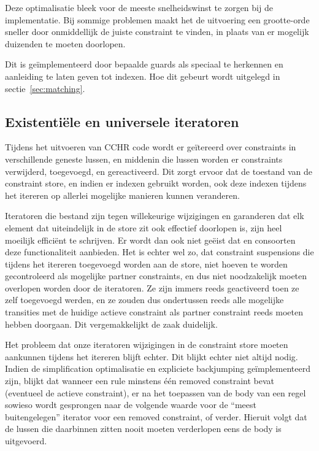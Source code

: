 Deze optimalisatie bleek voor de meeste snelheidswinst te zorgen bij de implementatie. Bij sommige problemen maakt het de uitvoering een grootte-orde sneller door onmiddellijk de juiste constraint te vinden, in plaats van er mogelijk duizenden te moeten doorlopen.

Dit is ge\"implementeerd door bepaalde guards als speciaal te herkennen en aanleiding te laten geven tot indexen. Hoe dit gebeurt wordt uitgelegd in sectie~\ref{sec:matching}.
 
\subsection{Existenti\"ele en universele iteratoren} \label{sec:gencode-iter}

Tijdens het uitvoeren van CCHR code wordt er ge\"itereerd over constraints in verschillende geneste lussen, en middenin die lussen worden er constraints verwijderd, toegevoegd, en gereactiveerd. Dit zorgt ervoor dat de toestand van de constraint store, en indien er indexen gebruikt worden, ook deze indexen tijdens het itereren op allerlei mogelijke manieren kunnen veranderen.

Iteratoren die bestand zijn tegen willekeurige wijzigingen en garanderen dat elk element dat uiteindelijk in de store zit ook effectief doorlopen is, zijn heel moeilijk effici\"ent te schrijven. Er wordt dan ook niet ge\"eist dat  en consoorten deze functionaliteit aanbieden. Het is echter wel zo, dat constraint suspensions die tijdens het itereren toegevoegd worden aan de store, niet hoeven te worden gecontroleerd als mogelijke partner constraints, en dus niet noodzakelijk moeten overlopen worden door de iteratoren. Ze zijn immers reeds geactiveerd toen ze zelf toegevoegd werden, en ze zouden dus ondertussen reeds alle mogelijke transities met de huidige actieve constraint als partner constraint reeds moeten hebben doorgaan. Dit vergemakkelijkt de zaak duidelijk.

Het probleem dat onze iteratoren wijzigingen in de constraint store moeten aankunnen tijdens het itereren blijft echter. Dit blijkt echter niet altijd nodig. Indien de simplification optimalisatie en expliciete backjumping ge\"implementeerd zijn, blijkt dat wanneer een rule minstens \'e\'en removed constraint bevat (eventueel de actieve constraint), er na het toepassen van de body van een regel sowieso wordt gesprongen naar de volgende waarde voor de ``meest buitengelegen'' iterator voor een removed constraint, of verder. Hieruit volgt dat de lussen die daarbinnen zitten nooit moeten verderlopen eens de body is uitgevoerd.


